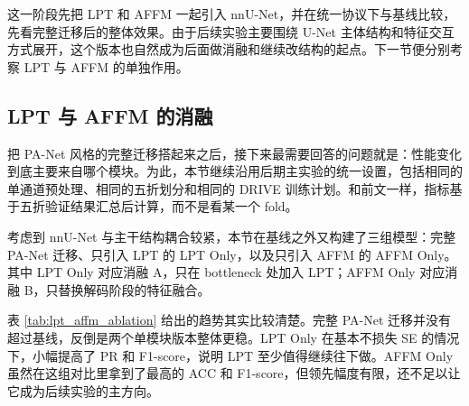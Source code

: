 \documentclass[a4paper,12pt]{article}
\begin{document}
这一阶段先把 LPT 和 AFFM 一起引入 nnU-Net，并在统一协议下与基线比较，先看完整迁移后的整体效果。由于后续实验主要围绕 U-Net 主体结构和特征交互方式展开，这个版本也自然成为后面做消融和继续改结构的起点。下一节便分别考察 LPT 与 AFFM 的单独作用。

\subsection{LPT 与 AFFM 的消融}

把 PA-Net 风格的完整迁移搭起来之后，接下来最需要回答的问题就是：性能变化到底主要来自哪个模块。为此，本节继续沿用后期主实验的统一设置，包括相同的单通道预处理、相同的五折划分和相同的 DRIVE 训练计划。和前文一样，指标基于五折验证结果汇总后计算，而不是看某一个 fold。

考虑到 nnU-Net 与主干结构耦合较紧，本节在基线之外又构建了三组模型：完整 PA-Net 迁移、只引入 LPT 的 LPT Only，以及只引入 AFFM 的 AFFM Only。其中 LPT Only 对应消融 A，只在 bottleneck 处加入 LPT；AFFM Only 对应消融 B，只替换解码阶段的特征融合。

\begin{table}[htbp]
\centering
\caption{LPT 与 AFFM 消融实验结果对比}
\label{tab:lpt_affm_ablation}
\end{table}

表 \ref{tab:lpt_affm_ablation} 给出的趋势其实比较清楚。完整 PA-Net 迁移并没有超过基线，反倒是两个单模块版本整体更稳。LPT Only 在基本不损失 SE 的情况下，小幅提高了 PR 和 F1-score，说明 LPT 至少值得继续往下做。AFFM Only 虽然在这组对比里拿到了最高的 ACC 和 F1-score，但领先幅度有限，还不足以让它成为后续实验的主方向。
\end{document}

